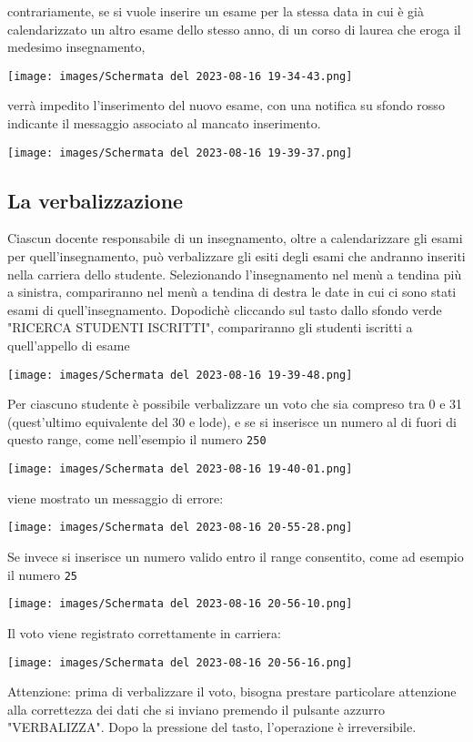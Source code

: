 \documentclass{article}
\begin{document}
    contrariamente, se si vuole inserire un esame per la stessa data in cui è già calendarizzato un altro esame dello stesso anno, di un corso di laurea che eroga il medesimo insegnamento,

    \texttt{[image: images/Schermata del 2023-08-16 19-34-43.png]}

    verrà impedito l'inserimento del nuovo esame, con una notifica su sfondo rosso indicante il messaggio associato al mancato inserimento.

    \texttt{[image: images/Schermata del 2023-08-16 19-39-37.png]}

    \subsection{La verbalizzazione}
    Ciascun docente responsabile di un insegnamento, oltre a calendarizzare gli esami per quell'insegnamento, può verbalizzare gli esiti degli esami che andranno inseriti nella carriera dello studente.
    Selezionando l'insegnamento nel menù a tendina più a sinistra, compariranno nel menù a tendina di destra le date in cui ci sono stati esami di quell'insegnamento. Dopodichè cliccando sul tasto dallo sfondo verde "RICERCA STUDENTI ISCRITTI", compariranno gli studenti iscritti a quell'appello di esame

    \texttt{[image: images/Schermata del 2023-08-16 19-39-48.png]}

    Per ciascuno studente è possibile verbalizzare un voto che sia compreso tra 0 e 31 (quest'ultimo equivalente del 30 e lode),
    e se si inserisce un numero al di fuori di questo range, come nell'esempio il numero \texttt{250}

    \texttt{[image: images/Schermata del 2023-08-16 19-40-01.png]}

    viene mostrato un messaggio di errore:

    \texttt{[image: images/Schermata del 2023-08-16 20-55-28.png]}

    Se invece si inserisce un numero valido entro il range consentito, come ad esempio il numero \texttt{25}

    \texttt{[image: images/Schermata del 2023-08-16 20-56-10.png]}

    Il voto viene registrato correttamente in carriera:

    \texttt{[image: images/Schermata del 2023-08-16 20-56-16.png]}

    Attenzione: prima di verbalizzare il voto, bisogna prestare particolare attenzione alla correttezza dei dati che si inviano premendo il pulsante azzurro "VERBALIZZA". Dopo la pressione del tasto, l'operazione è irreversibile.
\end{document}
